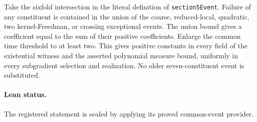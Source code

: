Take the sixfold intersection in the literal definition of
\texttt{section5Event}. Failure of
any constituent is contained in the union of the coarse, reduced-local,
quadratic, two kernel-Freedman, or crossing exceptional events. The union
bound gives a coefficient equal to the sum of their positive coefficients.
Enlarge the common time threshold to at least two. This gives positive
constants in every field of the existential witness and the asserted
polynomial measure bound, uniformly in every subgradient selection and
realization. No older seven-constituent event is substituted.
\paragraph{Lean status.}
The registered statement is sealed by applying its proved common-event provider.
